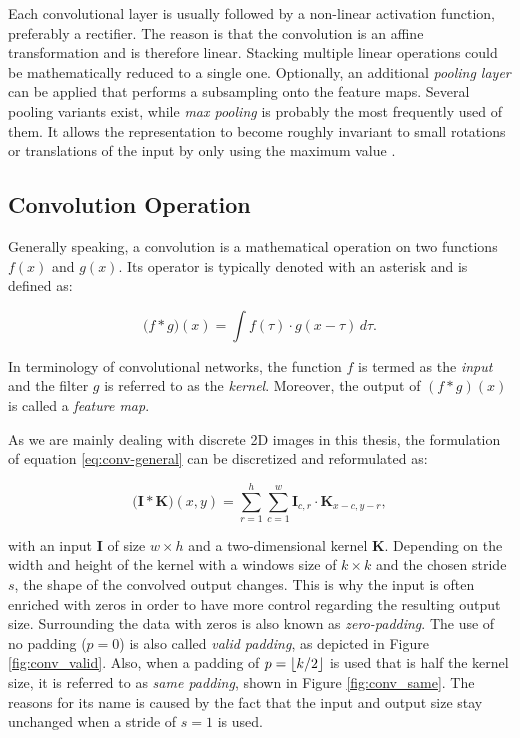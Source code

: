 Each convolutional layer is usually followed by a non-linear activation function, preferably a rectifier. The reason is that the convolution is an affine transformation and is therefore linear. Stacking multiple linear operations could be mathematically reduced to a single one. Optionally, an additional \textit{pooling layer} can be applied that performs a subsampling onto the feature maps. Several pooling variants exist, while \textit{max pooling} is probably the most frequently used of them. It allows the representation to become roughly invariant to small rotations or translations of the input by only using the maximum value \parencite[p. 343]{deep_learning}.


\subsection{Convolution Operation} \label{sec:conv-op}

Generally speaking, a convolution is a mathematical operation on two functions $f(x)$ and $g(x)$. Its operator is typically denoted with an asterisk \parencite[p. 332]{deep_learning} and is defined as:

\begin{equation} \label{eq:conv-general}
  \big(f \ast g\big)(x) = \int f(\tau) \cdot g(x-\tau) \, d\tau .
\end{equation}

In terminology of convolutional networks, the function $f$ is termed as the \textit{input} and the filter $g$ is referred to as the \textit{kernel}. Moreover, the output of $ (f \ast g)(x) $ is called a \textit{feature map}.

As we are mainly dealing with discrete 2D images in this thesis, the formulation of equation \ref{eq:conv-general} can be discretized and reformulated as:

\begin{equation} \label{eq:conv-2d}
  \big(\textbf{I} \ast \textbf{K}\big)(x,y) = \sum\limits_{r=1}^{h} \sum\limits_{c=1}^{w} \textbf{I}_{c,r} \cdot \textbf{K}_{x-c,y-r} ,
\end{equation}

with an input $ \textbf{I} $ of size $w \times h$ and a two-dimensional kernel $ \textbf{K} $. Depending on the width and height of the kernel with a windows size of $ k \times k $ and the chosen stride $ s $, the shape of the convolved output changes. This is why the input is often enriched with zeros in order to have more control regarding the resulting output size. Surrounding the data with zeros is also known as \textit{zero-padding}. The use of no padding ($p=0$) is also called \textit{valid padding}, as depicted in Figure \ref{fig:conv_valid}. Also, when a padding of $p=\lfloor k/2\rfloor$ is used that is half the kernel size, it is referred to as \textit{same padding}, shown in Figure \ref{fig:conv_same}. The reasons for its name is caused by the fact that the input and output size stay unchanged when a stride of $ s=1 $ is used.

